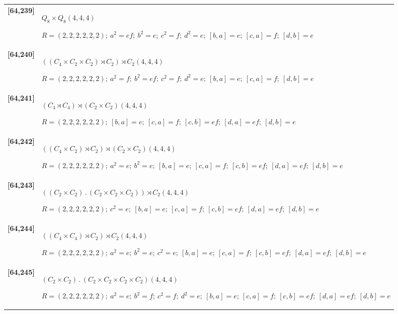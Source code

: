\documentclass[UTF8,fontset=fandol,11pt,a4paper]{ctexart}
\begin{document}
\begin{longtable}{@{}p{17mm}>{\raggedright\arraybackslash}p{141mm}@{}}
\textbf{[64,239]} & $Q_{8}\times Q_{8}$\quad $(4,4,4)$\par\(R=(2,2,2,2,2,2);\allowbreak\ a^{2}=ef;\allowbreak\ b^{2}=e;\allowbreak\ c^{2}=f;\allowbreak\ d^{2}=e;\allowbreak\ [b,a]=e;\allowbreak\ [c,a]=f;\allowbreak\ [d,b]=e\)\\[3pt]

\textbf{[64,240]} & $((C_{4}\times C_{2}\times C_{2})\rtimes C_{2})\rtimes C_{2}$\quad $(4,4,4)$\par\(R=(2,2,2,2,2,2);\allowbreak\ a^{2}=f;\allowbreak\ b^{2}=ef;\allowbreak\ c^{2}=f;\allowbreak\ d^{2}=e;\allowbreak\ [b,a]=e;\allowbreak\ [c,a]=f;\allowbreak\ [d,b]=e\)\\[3pt]

\textbf{[64,241]} & $(C_{4}\rtimes C_{4})\rtimes (C_{2}\times C_{2})$\quad $(4,4,4)$\par\(R=(2,2,2,2,2,2);\allowbreak\ [b,a]=e;\allowbreak\ [c,a]=f;\allowbreak\ [c,b]=ef;\allowbreak\ [d,a]=ef;\allowbreak\ [d,b]=e\)\\[3pt]

\textbf{[64,242]} & $((C_{4}\times C_{2})\rtimes C_{2})\rtimes (C_{2}\times C_{2})$\quad $(4,4,4)$\par\(R=(2,2,2,2,2,2);\allowbreak\ a^{2}=e;\allowbreak\ b^{2}=e;\allowbreak\ [b,a]=e;\allowbreak\ [c,a]=f;\allowbreak\ [c,b]=ef;\allowbreak\ [d,a]=ef;\allowbreak\ [d,b]=e\)\\[3pt]

\textbf{[64,243]} & $((C_{2}\times C_{2})\mathbin{.} (C_{2}\times C_{2}\times C_{2}))\rtimes C_{2}$\quad $(4,4,4)$\par\(R=(2,2,2,2,2,2);\allowbreak\ c^{2}=e;\allowbreak\ [b,a]=e;\allowbreak\ [c,a]=f;\allowbreak\ [c,b]=ef;\allowbreak\ [d,a]=ef;\allowbreak\ [d,b]=e\)\\[3pt]

\textbf{[64,244]} & $((C_{4}\times C_{4})\rtimes C_{2})\rtimes C_{2}$\quad $(4,4,4)$\par\(R=(2,2,2,2,2,2);\allowbreak\ a^{2}=e;\allowbreak\ b^{2}=e;\allowbreak\ c^{2}=e;\allowbreak\ [b,a]=e;\allowbreak\ [c,a]=f;\allowbreak\ [c,b]=ef;\allowbreak\ [d,a]=ef;\allowbreak\ [d,b]=e\)\\[3pt]

\textbf{[64,245]} & $(C_{2}\times C_{2})\mathbin{.} (C_{2}\times C_{2}\times C_{2}\times C_{2})$\quad $(4,4,4)$\par\(R=(2,2,2,2,2,2);\allowbreak\ a^{2}=e;\allowbreak\ b^{2}=f;\allowbreak\ c^{2}=f;\allowbreak\ d^{2}=e;\allowbreak\ [b,a]=e;\allowbreak\ [c,a]=f;\allowbreak\ [c,b]=ef;\allowbreak\ [d,a]=ef;\allowbreak\ [d,b]=e\)\\[3pt]


\end{longtable}
\end{document}

